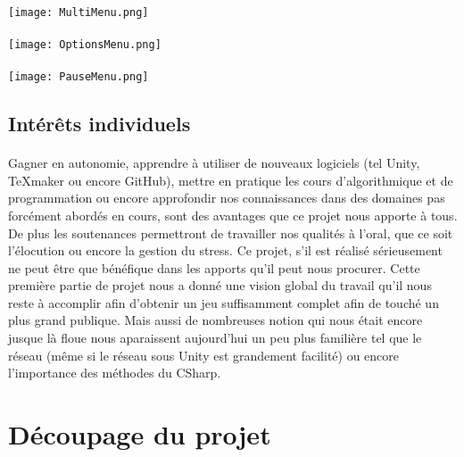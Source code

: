 \documentclass[12pt,a4paper]{article}
\begin{document}
\paragraph{}
\begin{center}
\texttt{[image: MultiMenu.png]}
\end{center}
\paragraph{}
\begin{center}
\texttt{[image: OptionsMenu.png]}
\end{center}
\paragraph{}
\begin{center}
\texttt{[image: PauseMenu.png]}
\end{center}
\newpage

\subsection{Intérêts individuels}
\paragraph{}
Gagner en autonomie, apprendre à utiliser de nouveaux logiciels (tel Unity, TeXmaker ou encore GitHub), mettre en pratique les cours d'algorithmique et de programmation ou encore approfondir nos connaissances dans des domaines pas forcément abordés en cours, sont des avantages que ce projet nous apporte à tous.
De plus les soutenances permettront de travailler nos qualités à l'oral, que ce soit l'élocution ou encore la gestion du stress. Ce projet, s'il est réalisé sérieusement ne peut être que bénéfique dans les apports qu'il peut nous procurer.
Cette première partie de projet nous a donné une vision global du travail qu'il nous reste à accomplir afin d'obtenir un jeu suffisamment complet afin de touché un plus grand publique. Mais aussi de nombreuses notion qui nous était encore jusque là floue nous aparaissent aujourd'hui un peu plus familière tel que le réseau (même si le réseau sous Unity est grandement facilité) ou encore l'importance des méthodes du CSharp.

\newpage
\section{Découpage du projet}
\end{document}
